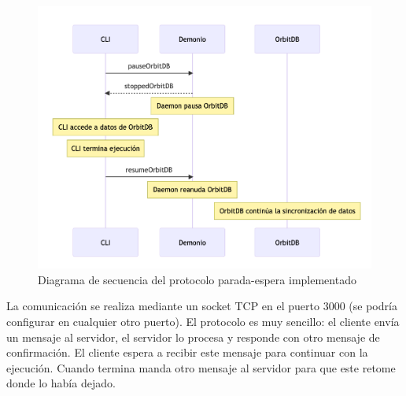 \begin{figure}[H]
  \centering
  \includegraphics[width=\textwidth]{images/parada-espera-orbitdb.png}
  \caption{Diagrama de secuencia del protocolo parada-espera implementado}
  \label{fig:parada-espera}
\end{figure}

La comunicación se realiza mediante un socket TCP en el puerto 3000 (se podría configurar en cualquier otro puerto). El protocolo es muy sencillo: el cliente envía un mensaje al servidor, el servidor lo procesa y responde con otro mensaje de confirmación. El cliente espera a recibir este mensaje para continuar con la ejecución. Cuando termina manda otro mensaje al servidor para que este retome donde lo había dejado.


